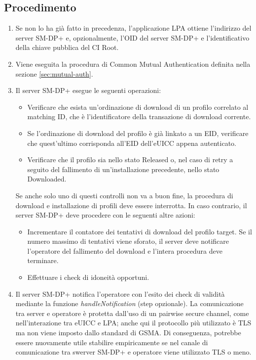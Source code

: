 \documentclass[10pt, twoside, openany]{book}
\begin{document}
\subsection{Procedimento}
\begin{enumerate}
\item Se non lo ha già fatto in precedenza, l'applicazione LPA ottiene l'indirizzo del server SM-DP+ e, opzionalmente, l'OID del server SM-DP+ e l'identificativo della chiave pubblica del CI Root.
\item Viene eseguita la procedura di Common Mutual Authentication definita nella sezione \ref{sec:mutual-auth}.
\item Il server SM-DP+ esegue le seguenti operazioni:
\begin{itemize}[itemsep=0pt]
\item Verificare che esista un'ordinazione di download di un profilo correlato al matching ID, che è l'identificatore della transazione di download corrente.
\item Se l'ordinazione di download del profilo è già linkato a un EID, verificare che quest'ultimo corrisponda all'EID dell'eUICC appena autenticato.
\item Verificare che il profilo sia nello stato Released o, nel caso di retry a seguito del fallimento di un'installazione precedente, nello stato Downloaded.
\end{itemize}
Se anche solo uno di questi controlli non va a buon fine, la procedura di download e installazione di profili deve essere interrotta. In caso contrario, il server SM-DP+ deve procedere con le seguenti altre azioni:
\begin{itemize}[itemsep=0pt]
\item Incrementare il contatore dei tentativi di download del profilo target. Se il numero massimo di tentativi viene sforato, il server deve notificare l'operatore del fallimento del download e l'intera procedura deve terminare.
\item Effettuare i check di idoneità opportuni.
\end{itemize}
\item Il server SM-DP+ notifica l'operatore con l'esito dei check di validità mediante la funzione \textit{handleNotification} (step opzionale). La comunicazione tra server e operatore è protetta dall'uso di un pairwise secure channel, come nell'interazione tra eUICC e LPA; anche qui il protocollo più utilizzato è TLS ma non viene imposto dallo standard di GSMA. Di conseguenza, potrebbe essere nuovamente utile stabilire empiricamente se nel canale di comunicazione tra swerver SM-DP+ e operatore viene utilizzato TLS o meno.

\end{enumerate}
\end{document}
